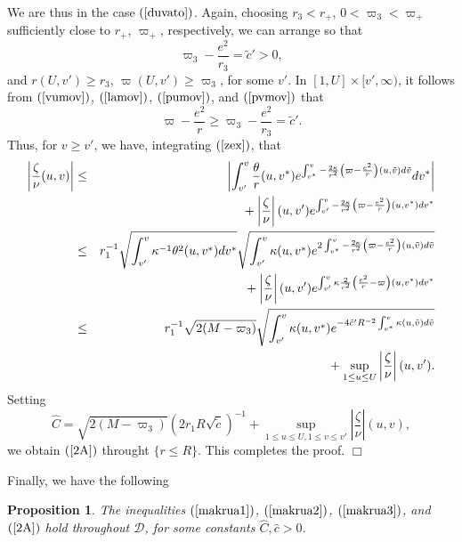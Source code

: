 \documentclass{article}
\newtheorem{proposition}{Proposition}[section]
\newcommand{\zn}{\frac{\zeta}{\nu}}
\begin{document}
We are thus in the case $(\ref{duvato})$. Again, choosing
$r_3<r_+$, $0<\varpi_3<\varpi_+$ sufficiently close to $r_+$, $\varpi_+$,
respectively,
we can arrange so that
\[
\varpi_3-\frac{e^2}{r_3}=\tilde{c}'>0,
\]
and $r(U,v')\ge r_3$, $\varpi(U,v')\ge\varpi_3$, for some $v'$.
In $[1,U]\times[v',\infty)$, it follows from
$(\ref{vumov})$, $(\ref{lamov})$, $(\ref{pumov})$, and $(\ref{pvmov})$
that
\begin{equation}
\label{3A}
\varpi-\frac{e^2}r\ge\varpi_3-\frac{e^2}{r_3}=\tilde{c}'.
\end{equation}
Thus, for $v\ge v'$, we have, integrating $(\ref{zex})$,
that
\begin{eqnarray*}
\left|\zn(u,v)\right|	&\le&	\left|\int_{v'}^v{\frac\theta{r}(u,v^*)e^{\int_{v^*}^v
							{-\frac{2\kappa}{r^2}
							\left(\varpi-\frac{e^2}r
							\right)(u,\tilde{v})
							d\tilde{v}}}dv^*}
							\right|\\
				&   &	\hbox{\ \ }
							+\left|\zn\right|(u,v')
							e^{\int_{v'}^v{-
							\frac{2\kappa}{r^2}\left(
							\varpi-\frac{e^2}r
							\right)(u,v^*)dv^*}}\\
				&\le&	r_1^{-1}\sqrt{\int_{v'}^v{\kappa^{-1}
							\theta^2}(u,v^*)dv^*}
							\sqrt{\int_{v'}^v{\kappa(u,v^*)
							e^{2\int_{v^*}^v{-
							\frac{2\kappa}{r^2}
							\left(\varpi-\frac{e^2}r
							\right)(u,\tilde{v})
							d\tilde{v}}}}}\\
				&	&	\hbox{\ \ }+\left|\zn\right|(u,v')
							e^{\int_{v'}^v{\kappa
							\frac{2}{r^2}
						\left(\frac{e^2}r-\varpi\right)
							(u,v^*)dv^*}}\\
				&\le& 	r_1^{-1}\sqrt{2(M-\varpi_3)}
						\sqrt{\int_{v'}^v{\kappa(u,v^*) 
							e^{-4\tilde{c}'R^{-2}\int_{v^*}^v
							{\kappa(u,\tilde{v})d\tilde{v}}}}}\\
				&&\hbox{}
							+\sup_{1\le u\le U}
							\left|\zn\right|(u,v').
\end{eqnarray*}
Setting
\[
\hat{C}=\sqrt{2(M-\varpi_3)}\left(2r_1R\sqrt{\tilde{c}}\right)^{-1}+
\sup_{1\le u\le U,1\le v\le v'}\left|\zn\right|(u,v),
\]
we obtain $(\ref{2A})$ throught $\{r\le R\}$.
This completes the proof. $\Box$		

Finally, we have the following
\begin{proposition}
\label{decaystor}
The inequalities  $(\ref{makrua1})$, $(\ref{makrua2})$,
$(\ref{makrua3})$, and $(\ref{2A})$ hold throughout $\mathcal{D}$,
for some constants $\hat{C},\hat{c}>0$.
\end{proposition}
\end{document}

